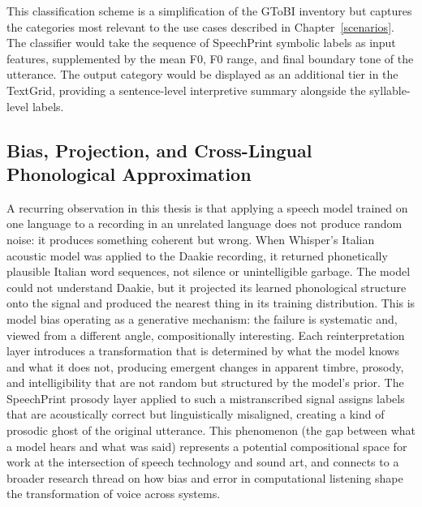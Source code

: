This classification scheme is a simplification of the GToBI inventory but
captures the categories most relevant to the use cases described in
Chapter~\ref{scenarios}. The classifier would take the sequence of SpeechPrint
symbolic labels as input features, supplemented by the mean F0, F0 range, and
final boundary tone of the utterance. The output category would be displayed as
an additional tier in the TextGrid, providing a sentence-level interpretive
summary alongside the syllable-level labels.

\subsection{Bias, Projection, and Cross-Lingual Phonological Approximation}
\label{sec:bias_projection}

A recurring observation in this thesis is that applying a speech model trained
on one language to a recording in an unrelated language does not produce random
noise: it produces something coherent but wrong. When Whisper's Italian
acoustic model was applied to the Daakie recording, it returned phonetically
plausible Italian word sequences, not silence or unintelligible garbage.
The model could not understand Daakie, but it
projected its learned phonological structure onto the signal and produced the
nearest thing in its training distribution. This is model bias operating as a
generative mechanism: the failure is systematic and, viewed from a different
angle, compositionally interesting. Each reinterpretation layer introduces a
transformation that is determined by what the model knows and what it does not,
producing emergent changes in apparent timbre, prosody, and intelligibility that
are not random but structured by the model's prior. The SpeechPrint prosody
layer applied to such a mistranscribed signal assigns labels that are acoustically
correct but linguistically misaligned, creating a kind of prosodic ghost of the
original utterance. This phenomenon (the gap between what a model hears and
what was said) represents a potential compositional space for work at the
intersection of speech technology and sound art, and connects to a broader
research thread on how bias and error in computational listening shape the
transformation of voice across systems.
